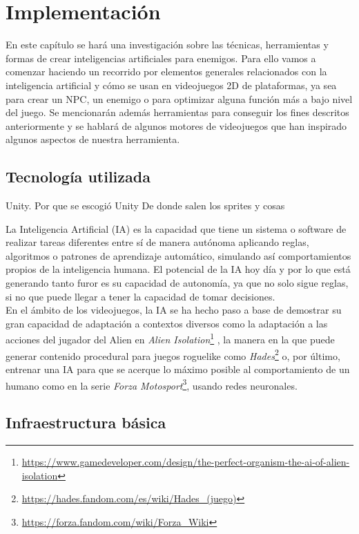 \setcounter{secnumdepth}{3} %
\chapter{Implementación}
\label{cap:implementacion}
En este capítulo se hará una investigación sobre las técnicas, herramientas y formas de crear inteligencias artificiales para enemigos.
Para ello vamos a comenzar haciendo un recorrido por elementos generales relacionados con la inteligencia artificial y cómo se usan en videojuegos 2D de plataformas, ya sea para crear un NPC, un enemigo o para optimizar alguna función más a bajo nivel del juego.
Se mencionarán además herramientas para conseguir los fines descritos anteriormente y se hablará de algunos motores de videojuegos que han inspirado algunos aspectos de nuestra herramienta. \\


\section{Tecnología utilizada}
Unity.
	Por que se escogió Unity
De donde salen los sprites y cosas

La Inteligencia Artificial (IA) es la capacidad que tiene un sistema o software de realizar tareas diferentes entre sí de manera autónoma aplicando reglas, algoritmos o patrones de aprendizaje automático, simulando así comportamientos propios de la inteligencia humana.
El potencial de la IA hoy día y por lo que está generando tanto furor es su capacidad de autonomía, ya que no solo sigue reglas, si no que puede llegar a tener la capacidad de tomar decisiones.\\
En el ámbito de los videojuegos, la IA se ha hecho paso a base de demostrar su gran capacidad de adaptación a contextos diversos como la adaptación a las acciones del jugador del Alien en \textit{Alien Isolation}\footnote{\url{https://www.gamedeveloper.com/design/the-perfect-organism-the-ai-of-alien-isolation}} , la manera en la que puede generar contenido procedural para juegos roguelike como \textit{Hades}\footnote{\url{https://hades.fandom.com/es/wiki/Hades_(juego)}} o, por último, entrenar una IA para que se acerque lo máximo posible al comportamiento de un humano como en la serie \textit{Forza Motosport}\footnote{\url{https://forza.fandom.com/wiki/Forza_Wiki}}, usando redes neuronales.\\


\section{Infraestructura básica}

